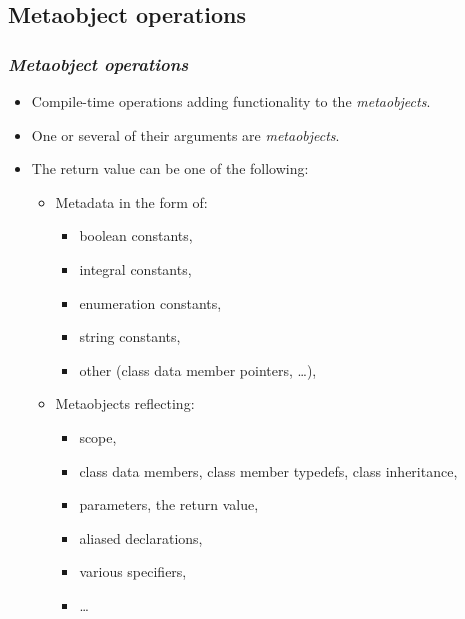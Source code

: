 \documentclass[compress,table,xcolor=table]{beamer}
\begin{document}
\subsection{Metaobject operations}
\begin{frame}
\frametitle{{\em Metaobject operations}}
  \begin{itemize}
    \small
    \item Compile-time operations adding functionality to the {\em metaobjects}.
    \item One or several of their arguments are {\em metaobjects}.
    \item The return value can be one of the following:
    \begin{itemize}
      \footnotesize
      \item Metadata in the form of:
      \begin{itemize}
        \item boolean constants,
        \item integral constants,
        \item enumeration constants,
        \item string constants,
        \item other (class data member pointers, \ldots),
      \end{itemize}
      \item Metaobjects reflecting:
      \begin{itemize}
        \item scope,
        \item class data members, class member typedefs, class inheritance,
        \item parameters, the return value,
        \item aliased declarations,
        \item various specifiers,
        \item \ldots
      \end{itemize}
    \end{itemize}
  \end{itemize}
\end{frame}
\end{document}
